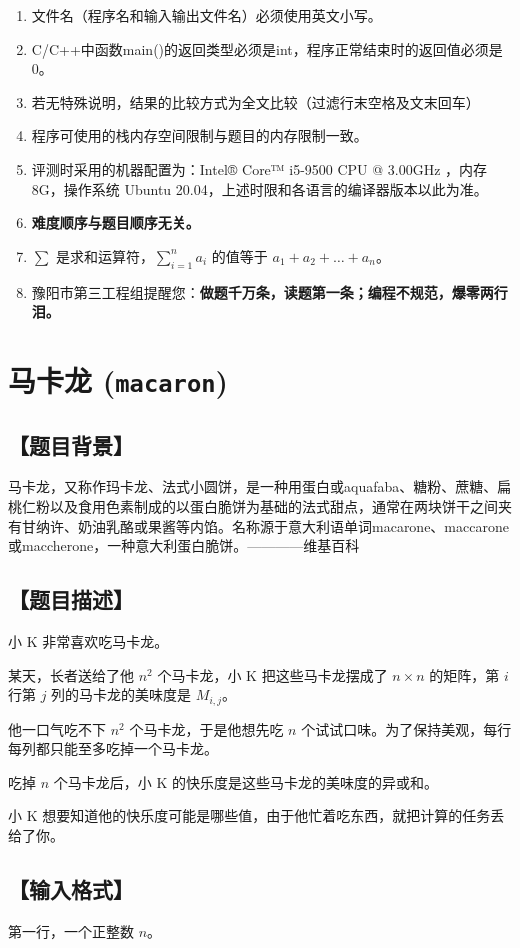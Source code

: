 \documentclass[UTF8]{ctexart}
\begin{document}
	\begin{enumerate}
		\item{文件名（程序名和输入输出文件名）必须使用英文小写。}
		\item{C/C++中函数main()的返回类型必须是int，程序正常结束时的返回值必须是0。}
		\item{若无特殊说明，结果的比较方式为全文比较（过滤行末空格及文末回车）}
		\item{程序可使用的栈内存空间限制与题目的内存限制一致。}
		\item{评测时采用的机器配置为：Intel® Core™ i5-9500 CPU @ 3.00GHz ，内存8G，操作系统 Ubuntu 20.04，上述时限和各语言的编译器版本以此为准。}
		\item{\textbf{难度顺序与题目顺序无关。}}
		\item{$\sum$ 是求和运算符，$\sum\limits_{i=1}^na_i$ 的值等于 $a_1+a_2+\dots+a_n$。}
		\item{豫阳市第三工程组提醒您：\textbf{做题千万条，读题第一条；编程不规范，爆零两行泪。}}
	\end{enumerate}
	\newpage
	\pagestyle{plain}
	\setcounter{page}{2}
	\newpage
	\section*{马卡龙 (\texttt{macaron})}
	\subsection*{【题目背景】}
	马卡龙，又称作玛卡龙、法式小圆饼，是一种用蛋白或aquafaba、糖粉、蔗糖、扁桃仁粉以及食用色素制成的以蛋白脆饼为基础的法式甜点，通常在两块饼干之间夹有甘纳许、奶油乳酪或果酱等内馅。名称源于意大利语单词macarone、maccarone或maccherone，一种意大利蛋白脆饼。————维基百科
	\subsection*{【题目描述】}
	小 K 非常喜欢吃马卡龙。
	
	某天，长者送给了他 $n^2$ 个马卡龙，小 K 把这些马卡龙摆成了 $n\times n$ 的矩阵，第 $i$ 行第 $j$ 列的马卡龙的美味度是 $M_{i,j}$。
	
	他一口气吃不下 $n^2$ 个马卡龙，于是他想先吃 $n$ 个试试口味。为了保持美观，每行每列都只能至多吃掉一个马卡龙。
	
	吃掉 $n$ 个马卡龙后，小 K 的快乐度是这些马卡龙的美味度的异或和。
	
	小 K 想要知道他的快乐度可能是哪些值，由于他忙着吃东西，就把计算的任务丢给了你。
	\subsection*{【输入格式】}
	第一行，一个正整数 $n$。
	
\end{document}
